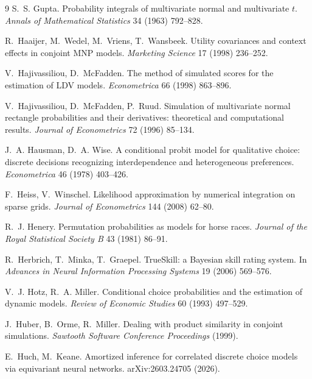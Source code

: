 \documentclass[12pt]{article}
\theoremstyle{remark}
\begin{document}
\begin{thebibliography}{9}
 S.~S. Gupta. Probability integrals of
multivariate normal and multivariate $t$. \emph{Annals of Mathematical
Statistics} 34 (1963) 792--828.

 R.~Haaijer, M.~Wedel, M.~Vriens, T.~Wansbeek.
Utility covariances and context effects in conjoint MNP models.
\emph{Marketing Science} 17 (1998) 236--252.

 V.~Hajivassiliou, D.~McFadden. The method of
simulated scores for the estimation of LDV models. \emph{Econometrica} 66
(1998) 863--896.

 V.~Hajivassiliou, D.~McFadden, P.~Ruud. Simulation of
multivariate normal rectangle probabilities and their derivatives:
theoretical and computational results. \emph{Journal of Econometrics} 72
(1996) 85--134.

 J.~A. Hausman, D.~A.
Wise. A conditional probit model for qualitative choice: discrete
decisions recognizing interdependence and heterogeneous preferences.
\emph{Econometrica} 46 (1978) 403--426.

 F.~Heiss, V.~Winschel.
Likelihood approximation by numerical integration on sparse grids.
\emph{Journal of Econometrics} 144 (2008) 62--80.

 R.~J. Henery. Permutation
probabilities as models for horse races. \emph{Journal of the Royal
Statistical Society B} 43 (1981) 86--91.

 R.~Herbrich, T.~Minka, T.~Graepel. TrueSkill: a
Bayesian skill rating system. In \emph{Advances in Neural Information
Processing Systems} 19 (2006) 569--576.

 V.~J. Hotz, R.~A. Miller. Conditional choice
probabilities and the estimation of dynamic models. \emph{Review of
Economic Studies} 60 (1993) 497--529.

 J.~Huber,
B.~Orme, R.~Miller. Dealing with product similarity in conjoint
simulations. \emph{Sawtooth Software Conference Proceedings} (1999).

 E.~Huch, M.~Keane. Amortized inference for correlated
discrete choice models via equivariant neural networks. arXiv:2603.24705
(2026).


\end{thebibliography}
\end{document}
